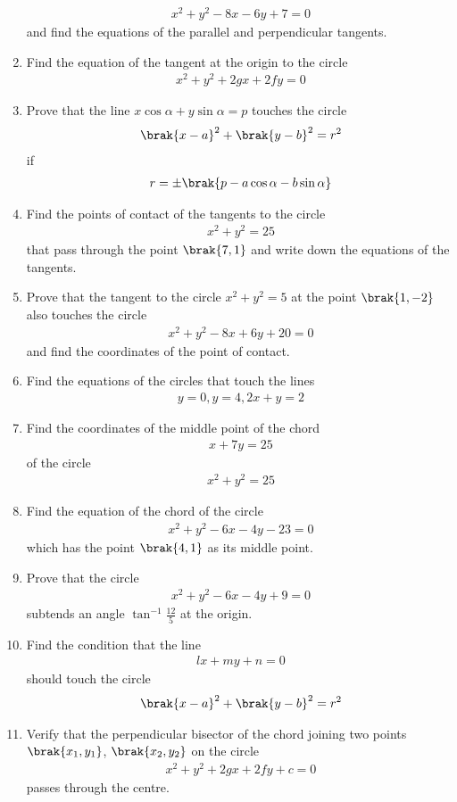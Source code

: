 \begin{enumerate}[1.]
\begin{align*}
x^2+y^2-8x-6y+7 = 0
\end{align*}
and find the equations of the parallel and perpendicular tangents.
\item Find the equation of the tangent at the origin to the circle
\begin{align*}
x^2+y^2+2gx+2fy=0
\end{align*}
\item Prove that the line $x\cos\alpha+y\sin\alpha = p$ touches the circle
\begin{align*}
\brak{x-a}^2+\brak{y-b}^2 = r^2
\end{align*}
if
\begin{align*}
r = \pm \brak{p-a\cos\alpha-b\sin\alpha}
\end{align*}
\item Find the points of contact of the tangents to the circle
\begin{align*}
x^2+y^2=25
\end{align*}
that pass through the point $\brak{7,1}$ and write down the equations of the tangents.
\item Prove that the tangent to the circle $x^2+y^2=5$ at the point $\brak{1,-2}$ also touches the circle
\begin{align*}
x^2+y^2-8x+6y+20=0
\end{align*}
and find the coordinates of the point of contact.
\item Find the equations of the circles that touch the lines
\begin{align*}
y=0, y=4, 2x+y = 2
\end{align*}
\item Find the coordinates of the middle point of the chord
\begin{align*}
x+7y=25
\end{align*}
of the circle
\begin{align*}
x^2+y^2=25
\end{align*}
\item Find the equation of the chord of the circle
\begin{align*}
x^2+y^2-6x-4y-23 = 0
\end{align*}
which has the point $\brak{4,1}$ as its middle point.
\item Prove that the circle
\begin{align*}
x^2+y^2-6x-4y+9 = 0
\end{align*}
subtends an angle $\tan^{-1}\frac{12}{5}$ at the origin.
\item Find the condition that the line
\begin{align*}
lx+my+n = 0
\end{align*}
should touch the circle
\begin{align*}
\brak{x-a}^2+\brak{y-b}^2 = r^2
\end{align*}
\item Verify that the perpendicular bisector of the chord joining two points $\brak{x_1,y_1}$, $\brak{x_2,y_2}$ on the circle
\begin{align*}
x^2+y^2+2gx+2fy+c = 0
\end{align*}
passes through the centre.
\end{enumerate}